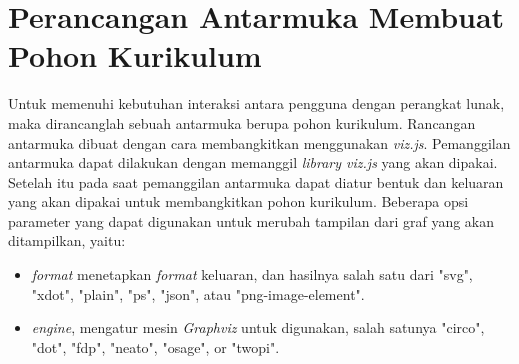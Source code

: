\section{Perancangan Antarmuka Membuat Pohon Kurikulum}
\label{sec: Perancangan Antarmuka Membuat Pohon Kurikulum}
Untuk memenuhi kebutuhan interaksi antara pengguna dengan perangkat lunak, maka dirancanglah sebuah antarmuka berupa pohon kurikulum. Rancangan antarmuka dibuat dengan cara membangkitkan menggunakan \textit{viz.js}. Pemanggilan antarmuka dapat dilakukan dengan memanggil \textit {library viz.js} yang akan dipakai. Setelah itu pada saat pemanggilan antarmuka dapat diatur bentuk dan keluaran yang akan dipakai untuk membangkitkan pohon kurikulum. Beberapa opsi parameter yang dapat digunakan untuk merubah tampilan dari graf yang akan ditampilkan, yaitu:
\begin{itemize}
\item \textit{format} menetapkan \textit{format} keluaran, dan hasilnya salah satu dari "svg", "xdot", "plain", "ps", "json", atau "png-image-element". 
\item \textit{engine}, mengatur mesin \textit{Graphviz} untuk digunakan, salah satunya "circo", "dot", "fdp", "neato", "osage", or "twopi".
\end{itemize}  